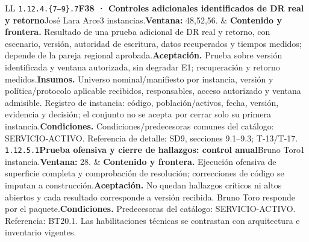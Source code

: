 \begin{longtable}{L{\tabcolsep\relax}L{\tabcolsep\relax}}
\texttt{1.\allowbreak{}12.\allowbreak{}4.\allowbreak{}\{7--9\}.\allowbreak{}7}\newline{}\textbf{F38 · Controles adicionales identificados de DR real y retorno}\newline{}José Lara Arce\newline{}3 instancias.\newline{}\textbf{Ventana:} 48,52,56. & \textbf{Contenido y frontera.} Resultado de una prueba adicional de DR real y retorno, con escenario, versión, autoridad de escritura, datos recuperados y tiempos medidos; depende de la pareja regional aprobada.\newline{}\textbf{Aceptación.} Prueba sobre versión identificada y ventana autorizada, sin degradar E1; recuperación y retorno medidos.\newline{}\textbf{Insumos.} Universo nominal/manifiesto por instancia, versión y política/protocolo aplicable recibidos, responsables, acceso autorizado y ventana admisible. Registro de instancia: código, población/activos, fecha, versión, evidencia y decisión; el conjunto no se acepta por cerrar solo su primera instancia.\newline{}\textbf{Condiciones.} Condiciones/predecesoras comunes del catálogo: SERVICIO-ACTIVO. Referencia de detalle: SD9, secciones 9.1--9.3; T-13/T-17.\\\hline
\texttt{1.\allowbreak{}12.\allowbreak{}5.\allowbreak{}1}\newline{}\textbf{Prueba ofensiva y cierre de hallazgos: control anual}\newline{}Bruno Toro\newline{}1 instancia.\newline{}\textbf{Ventana:} 28. & \textbf{Contenido y frontera.} Ejecución ofensiva de superficie completa y comprobación de resolución; correcciones de código se imputan a construcción.\newline{}\textbf{Aceptación.} No quedan hallazgos críticos ni altos abiertos y cada resultado corresponde a versión recibida. Bruno Toro responde por el paquete.\newline{}\textbf{Condiciones.} Predecesoras del catálogo: SERVICIO-ACTIVO. Referencia: BT20.1. Las habilitaciones técnicas se contrastan con arquitectura e inventario vigentes.\\\hline

\end{longtable}
